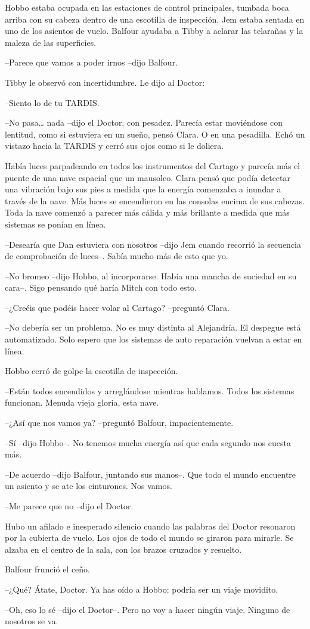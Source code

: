 {Hobbo estaba ocupada en las estaciones de
 control principales, tumbada boca arriba con su cabeza dentro de una
 escotilla de inspección. Jem estaba sentada en uno de los asientos de
 vuelo. Balfour ayudaba a Tibby a aclarar las telarañas y la maleza de
las superficies.}

{--Parece que vamos a poder irnos --dijo Balfour.}

{Tibby le observó con incertidumbre. Le dijo al Doctor:}

{--Siento lo de tu TARDIS.}

{--No pasa\ldots{} nada --dijo el Doctor, con pesadez. Parecía estar
 moviéndose con lentitud, como si estuviera en un sueño, pensó Clara. O
 en una pesadilla. Echó un vistazo hacia la TARDIS y cerró sus ojos como
si le doliera.}

{Había luces parpadeando en todos los instrumentos del Cartago y parecía
 más el puente de una nave espacial que un mausoleo. Clara pensó que
 podía detectar una vibración bajo sus pies a medida que la energía
 comenzaba a inundar a través de la nave. Más luces se encendieron en las
 consolas encima de sus cabezas. Toda la nave comenzó a parecer más
cálida y más brillante a medida que más sistemas se ponían en línea.}

{--Desearía que Dan estuviera con nosotros --dijo Jem cuando recorrió la
secuencia de comprobación de luces--. Sabía mucho más de esto que yo.}

{--No bromeo --dijo Hobbo, al incorporarse. Había una mancha de suciedad
en su cara--. Sigo pensando qué haría Mitch con todo esto.}

{--¿Creéis que podéis hacer volar al Cartago? --preguntó Clara.}

{--No debería ser un problema. No es muy distinta al Alejandría. El
 despegue está automatizado. Solo espero que los sistemas de auto
reparación vuelvan a estar en línea.}

{Hobbo cerró de golpe la escotilla de inspección.}

{--Están todos encendidos y arreglándose mientras hablamos. Todos los
sistemas funcionan. Menuda vieja gloria, esta nave.}

{--¿Así que nos vamos ya? --preguntó Balfour, impacientemente.}

{--Sí --dijo Hobbo--. No tenemos mucha energía así que cada segundo nos
cuesta más.}

{--De acuerdo --dijo Balfour, juntando sus manos--. Que todo el mundo
encuentre un asiento y se ate los cinturones. Nos vamos.}

{--Me parece que no --dijo el Doctor.}

{Hubo un afilado e inesperado silencio cuando las palabras del Doctor
 resonaron por la cubierta de vuelo. Los ojos de todo el mundo se giraron
 para mirarle. Se alzaba en el centro de la sala, con los brazos cruzados
y resuelto.}

{Balfour frunció el ceño.}

{--¿Qué? Átate, Doctor. Ya has oído a Hobbo: podría ser un viaje
movidito.}

{--Oh, eso lo sé --dijo el Doctor--. Pero no voy a hacer ningún viaje.
Ninguno de nosotros se va.}
